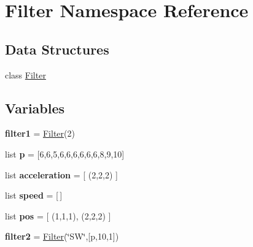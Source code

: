 \hypertarget{namespace_filter}{}\section{Filter Namespace Reference}
\label{namespace_filter}
\subsection*{Data Structures}
\begin{DoxyCompactItemize}
\item 
class \mbox{\hyperlink{class_filter_1_1_filter}{Filter}}
\end{DoxyCompactItemize}
\subsection*{Variables}
\begin{DoxyCompactItemize}
\item 
\mbox{\label{namespace_filter_a60d425eccab3908b6499795c13622cd0}} 
{\bfseries filter1} = \mbox{\hyperlink{class_filter_1_1_filter}{Filter}}(2)
\item 
\mbox{\label{namespace_filter_ace2200d179440dbd1817a49ea327ec6f}} 
list {\bfseries p} = \mbox{[}6,6,5,6,6,6,6,6,6,8,9,10\mbox{]}
\item 
\mbox{\label{namespace_filter_a4e382a813959a75d3f524f007c027968}} 
list {\bfseries acceleration} = \mbox{[} (2,2,2) \mbox{]}
\item 
\mbox{\label{namespace_filter_a88499f7882adbc30755ac919cb01742b}} 
list {\bfseries speed} = \mbox{[}$\,$\mbox{]}
\item 
\mbox{\label{namespace_filter_a2877ae8d48950523a56a329ed2b805ce}} 
list {\bfseries pos} = \mbox{[} (1,1,1), (2,2,2) \mbox{]}
\item 
\mbox{\label{namespace_filter_aafc6a461008ed3c293a56c342600e50d}} 
{\bfseries filter2} = \mbox{\hyperlink{class_filter_1_1_filter}{Filter}}(\char`\"{}SW\char`\"{},\mbox{[}p,10,1\mbox{]})
\end{DoxyCompactItemize}


